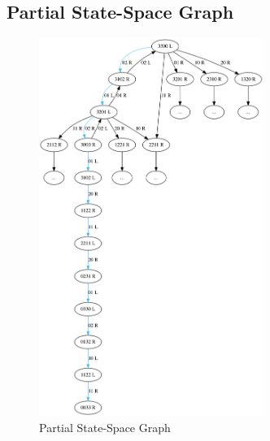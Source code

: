 \documentclass[11pt]{article}
\begin{document}
\subsection{Partial State-Space Graph}
\begin{figure}[ht]
	\centering
  \includegraphics[width=0.65\textwidth]{./statespace.png}
  \caption{Partial State-Space Graph}
	\label{fig2}
\end{figure}
\end{document}
